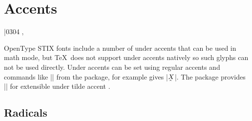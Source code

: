  \section{Accents}
 \begin{multicols}{2}
 \showaccent{}
 \showaccent{}
 \showaccent{}
 \showaccent{}
 \showaccent\bar{0304}{}
 \showaccent{}
 \showaccent{}
 \showaccent{}
 \showaccent{}
 \showaccent{}
 \showaccent{}
 \showaccent{}
 \showaccent{}
 \showaccent{}
 \showaccent{}
 \showaccent{}
 \showaccent{}
 \showaccent{}, \cmd\rightarrowaccent
 \showaccent{}
 \showaccent{}
 \showaccent{}
 \showaccent{}
 \showaccent{}
 \end{multicols}

 \begin{multicols}{2}
 \showwideaccent{}
 \showwideaccent{}
 \showwideaccent{}
 \showwideaccent{}
 \showwideaccent{}
 \showwideaccent{}
 \showwideaccent{}
 \showwideaccent{}
 \end{multicols}

 OpenType STIX fonts include a number of under accents that can be used in
 math mode, but \TeX\ does not support under accents natively so such glyphs
 can not be used directly. Under accents can be set using regular accents and
 commands like |\underaccent| from the  package, for example
 gives |\(\underaccent{\hat}{X}\)|. The
  package provides |\utilde| for extensible under tilde
 accent \citep{undertilde}.
 
 
 \begin{multicols}{2}
 \showover{}
 \showover{}
 \showover{} %
 \showover{}
 \showover{}
 \end{multicols}

 \subsection{Radicals}
 \begin{multicols}{2}
 \showaccent{}
 \showaccent{}
 \end{multicols}
 
 
 
 
 
 